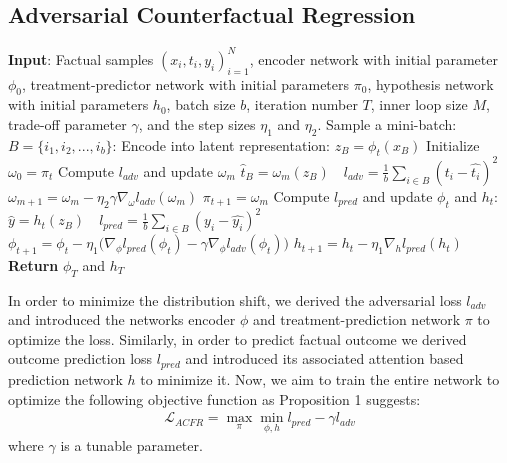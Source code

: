 \documentclass[letterpaper]{article} %
\begin{document}
\subsection{Adversarial Counterfactual Regression}
\begin{algorithm}[!ht]
\caption{Adversarial CounterFactual Regression}
\begin{algorithmic}[1]
    \State \textbf{Input}: Factual samples {$(x_i, t_i, y_i)_{i=1}^N$}, encoder network with initial parameter $\phi_0$, treatment-predictor network with initial parameters $\pi_0$, hypothesis network with initial parameters $h_0$, batch size $b$, iteration number $T$, inner loop size $M$, trade-off parameter $\gamma$, and the step sizes $\eta_1$ and $\eta_2$.
        \State Sample a mini-batch: $B = \{i_1, i_2,..., i_b\}$:
        \State Encode into latent representation: $z_B = \phi_{t}(x_B)$
        \State Initialize $\omega_0 = \pi_t$
            \State Compute $l_{adv}$ and update $\omega_{m}$
            \State $\hat{t}_B = \omega_{m}(z_B) \quad l_{adv} = \frac{1}{b} \sum_{i \in B} (t_i - \hat{t_i})^2$
            \State $\omega_{m+1} = \omega_{m} - \eta_2 \gamma \nabla_{\omega} l_{adv}(\omega_m)$
        \EndFor
        \State $\pi_{t+1} = \omega_m$
        \State Compute $l_{pred}$ and update $\phi_t$ and $h_t$:
        \State $\hat{y} = h_t(z_B) \quad l_{pred} = \frac{1}{b} \sum_{i \in B}(y_i - \hat{y_i})^2$
        \State $\phi_{t+1} = \phi_t - \eta_1 \big(\nabla_{\phi} l_{pred}(\phi_t) - \gamma \nabla_{\phi} l_{adv}(\phi_t) \big)$
        \State $h_{t+1} = h_t - \eta_1 \nabla_{h} l_{pred}(h_t)$
    \EndFor
    \State \textbf{Return} $\phi_T$ and $h_T$
\end{algorithmic}
\label{alg:acfr}
\end{algorithm}
In order to minimize the distribution shift, we derived the adversarial loss $l_{adv}$ and introduced the networks encoder $\phi$ and treatment-prediction network $\pi$ to optimize the loss. Similarly, in order to predict factual outcome we derived outcome prediction loss $l_{pred}$ and introduced its associated attention based prediction network $h$ to minimize it. Now, we aim to train the entire network to optimize the following objective function as Proposition 1 suggests:
\begin{align*}
   \mathcal{L}_{ACFR} = \max_{\pi}\min_{\phi, h} l_{pred} - \gamma l_{adv} 
\end{align*}
where $\gamma$ is a tunable parameter. 
\end{document}
